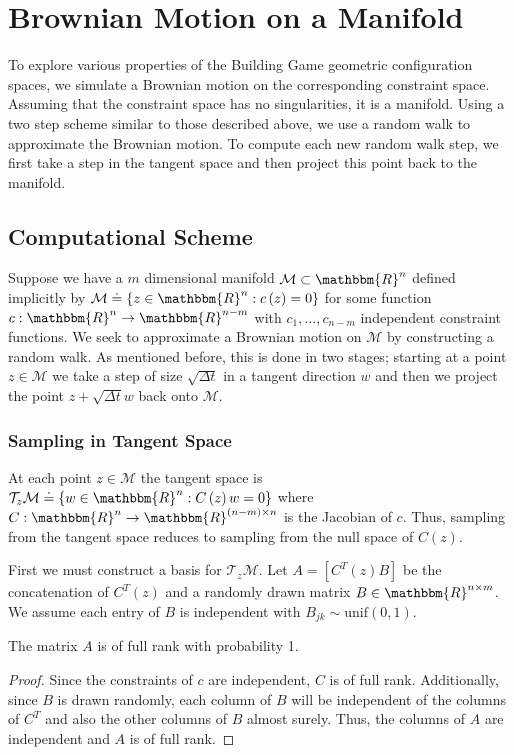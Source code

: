 %
\section{Brownian Motion on a Manifold}

To explore various properties of the Building Game geometric configuration spaces, we simulate a Brownian motion on the corresponding constraint space. Assuming that the constraint space has no singularities, it is a manifold. Using a two step scheme similar to those described above, we use a random walk to approximate the Brownian motion. To compute each new random walk step, we first take a step in the tangent space and then project this point back to the manifold. 

\subsection{Computational Scheme}

Suppose we have a $m$ dimensional manifold $\mathcal{M} \subset \mathbbm{R}^n$ defined implicitly by $\mathcal{M} \doteq \left\{z \in \mathbbm{R}^n : c\left(z\right) = 0\right\}$ for some function $c: \mathbbm{R}^n \to \mathbbm{R}^{n-m}$ with $c_1,\dots,c_{n-m}$ independent constraint functions. We seek to approximate a Brownian motion on $\mathcal{M}$ by constructing a random walk. As mentioned before, this is done in two stages; starting at a point $z \in \mathcal{M}$ we take a step of size $\sqrt{\Delta t}$ in a tangent direction $w$ and then we project the point $z +\sqrt{\Delta t} w$ back onto $\mathcal{M}$. 

\subsubsection{Sampling in Tangent Space}  

At each point $z \in \mathcal{M}$ the tangent space is $\mathcal{T}_z\mathcal{M} \doteq \left\{w \in \mathbbm{R}^n : C\left(z\right)w = 0\right\}$ where $C: \mathbbm{R}^n \to \mathbbm{R}^{(n-m)\times n}$ is the Jacobian of $c$. Thus, sampling from the tangent space reduces to sampling from the null space of $C(z)$. 

First we must construct a basis for $\mathcal{T}_z\mathcal{M}$. Let $A = [C^T(z) B]$ be the concatenation of $C^T(z)$ and a randomly drawn matrix $B \in \mathbbm{R}^{n\times m}$. We assume each entry of $B$ is independent with $B_{jk} \sim  \text{unif}(0,1)$. 
\begin{mylem}
The matrix $A$ is of full rank with probability 1. 
\end{mylem}
\begin{proof}
Since the constraints of $c$ are independent, $C$ is of full rank. Additionally, since $B$ is drawn randomly, each column of $B$ will be independent of the columns of $C^T$  and also the other columns of $B$ almost surely. Thus, the columns of $A$ are independent and $A$ is of full rank. 
\end{proof}


